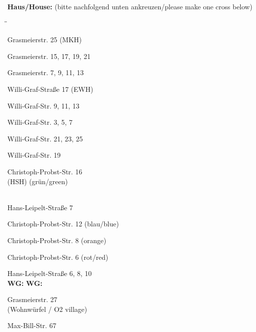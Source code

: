 \documentclass[a4paper,10pt]{scrartcl}
\newcommand{\myRadioBox}{
	\setlength{\fboxrule}{2pt}
	\setlength{\fboxsep}{0.5em}
	\raisebox{0.3em}{\fbox{}}
	\rule{0pt}{1.5em}
}
\begin{document}
\vfill

\LARGE \textbf{Haus/House:} \hspace*{10pt} \large{(bitte nachfolgend unten ankreuzen/please make one cross below)} \\
\vspace{-10pt}

{\large

\begin{multicols}{2}

\begin{tabbing}
	\hspace*{3.5em}\=\hspace*{2.5em}\=\kill
	\myRadioBox {} \> Grasmeierstr. 25 (MKH) \\
	\myRadioBox {} \> Grasmeierstr. 15, 17, 19, 21 \\
	\myRadioBox {} \> Grasmeierstr. 7, 9, 11, 13 \\
	\myRadioBox {} \> Willi-Graf-Straße 17 (EWH) \\
	\myRadioBox {} \> Willi-Graf-Str. 9, 11, 13 \\
	\myRadioBox {} \> Willi-Graf-Str. 3, 5, 7 \\
	\myRadioBox {} \> Willi-Graf-Str. 21, 23, 25 \\
	\myRadioBox {} \> Willi-Graf-Str. 19 \\
	\myRadioBox {} \> Christoph-Probst-Str. 16\\
		\> \>(HSH) (grün/green)\\
		\\
	\myRadioBox {} \> Hans-Leipelt-Straße 7 \\
	\myRadioBox {} \> Christoph-Probst-Str. 12 (blau/blue) \\
	\myRadioBox {} \> Christoph-Probst-Str. 8 (orange) \\
	\myRadioBox {} \> Christoph-Probst-Str. 6 (rot/red) \\
	\myRadioBox {} \> Hans-Leipelt-Straße 6, 8, 10 \\
	\> \>
		{\textbf{WG:} \mbox{\underline{\TextField[name=wg, bordercolor=white, width=2em, maxlen=2, borderwidth=0]{ }}}}
		{\textbf{WG:} \Large{\hspace{.1em} \raisebox{-0.15em}{\color{gray} $\rightangle \hspace{.5em} \rightangle$ \enspace}}} \\
	\myRadioBox {} \> Grasmeierstr. 27 \\
		\> \>(Wohnwürfel / O2 village) \\
	\myRadioBox {} \> Max-Bill-Str. 67 \\
\end{tabbing}

\end{multicols}

}
\end{document}
